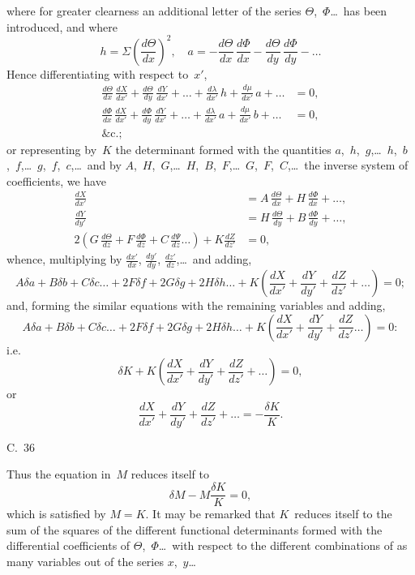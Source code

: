 \documentclass[11pt,a4paper]{book}
\begin{document}
\newpage
where for greater clearness an additional letter of the series $\Theta$,~$\Phi$\ldots\ has been introduced, and where
\[
h = \Sigma\left(\frac{d\Theta}{dx}\right)^2, \quad
a = -\frac{d\Theta}{dx}\,\frac{d\Phi}{dx} - \frac{d\Theta}{dy}\,\frac{d\Phi}{dy} - \ldots
\]
Hence differentiating with respect to~$x'$,
\begin{align*}
\frac{d\Theta}{dx}\,\frac{dX}{dx'} + \frac{d\Theta}{dy}\,\frac{dY}{dx'} + \ldots + \frac{d\lambda}{dx'}\,h + \frac{d\mu}{dx'}\,a + \ldots &= 0,\\
\frac{d\Phi}{dx}\,\frac{dX}{dx'} + \frac{d\Phi}{dy}\,\frac{dY}{dx'} + \ldots + \frac{d\lambda}{dx'}\,a + \frac{d\mu}{dx'}\,b + \ldots &= 0,\\
\&\text{c.};
\end{align*}
or representing by~$K$ the determinant formed with the quantities $a$,~$h$,~$g$,\ldots\ $h$,~$b$,~$f$,\ldots\ $g$,~$f$,~$c$,\ldots\ and by $A$,~$H$,~$G$,\ldots\ $H$,~$B$,~$F$,\ldots\ $G$,~$F$,~$C$,\ldots\ the inverse system of coefficients, we have
\begin{align*}
\frac{dX}{dx'} &= A\,\frac{d\Theta}{dx} + H\,\frac{d\Phi}{dx} + \ldots,\\
\frac{dY}{dy'} &= H\,\frac{d\Theta}{dy} + B\,\frac{d\Phi}{dy} + \ldots,\\
2(G\,\frac{d\Theta}{dz} + F\,\frac{d\Phi}{dz} + C\,\frac{d\Psi}{dz}\ldots) + K\frac{dZ}{dz'} &= 0,
\end{align*}
whence, multiplying by $\frac{dx'}{dx}$, $\frac{dy'}{dy}$, $\frac{dz'}{dz}$,\ldots\ and adding,
\[
A\delta a + B\delta b + C\delta c\ldots + 2F\delta f + 2G\delta g + 2H\delta h\ldots + K\left(\frac{dX}{dx'} + \frac{dY}{dy'} + \frac{dZ}{dz'} + \ldots\right) = 0;
\]
and, forming the similar equations with the remaining variables and adding,
\[
A\delta a + B\delta b + C\delta c\ldots + 2F\delta f + 2G\delta g + 2H\delta h\ldots + K\left(\frac{dX}{dx'} + \frac{dY}{dy'} + \frac{dZ}{dz'}\ldots\right) = 0:
\]
i.e.
\[
\delta K + K\left(\frac{dX}{dx'} + \frac{dY}{dy'} + \frac{dZ}{dz'} + \ldots\right) = 0,
\]
or
\[
\frac{dX}{dx'} + \frac{dY}{dy'} + \frac{dZ}{dz'} + \ldots = -\frac{\delta K}{K}.
\]

\begin{center}
C.~36
\end{center}

\newpage
Thus the equation in~$M$ reduces itself to
\[
\delta M - M\frac{\delta K}{K} = 0,
\]
which is satisfied by $M = K$. It may be remarked that $K$~reduces itself to the sum of the squares of the different functional determinants formed with the differential coefficients of $\Theta$,~$\Phi$\ldots\ with respect to the different combinations of as many variables out of the series $x$,~$y$\ldots
\end{document}
